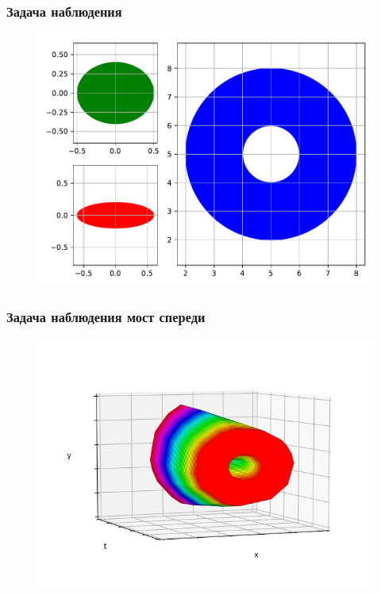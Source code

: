 \documentclass{beamer}
\begin{document}

  \begin{frame}
    \frametitle{Задача наблюдения}

    \begin{figure}
        \includegraphics[width=\linewidth,height=0.8\textheight,keepaspectratio]{example2_pqm}
    \end{figure}

  \end{frame}  


  \begin{frame}
    \frametitle{Задача наблюдения мост спереди}

    \begin{figure}
        \includegraphics[width=\linewidth,height=0.8\textheight,keepaspectratio]{example2_bridge_front}
    \end{figure} 

  \end{frame}
\end{document}
